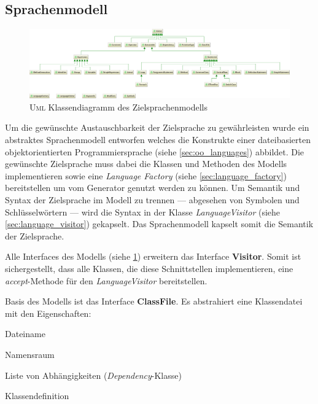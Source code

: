 \subsection{Sprachenmodell}
\label{sec:language_model}

\begin{figure}
    \centering
    \includegraphics[width=\textheight]{resources/languagemodel_common}
    \caption{\textsc{Uml} Klassendiagramm des Zielsprachenmodells}
    \label{fig:language_model}
\end{figure}

Um die gewünschte Austauschbarkeit der Zielsprache zu gewährleisten wurde ein abstraktes Sprachenmodell entworfen welches die Konstrukte einer dateibasierten objektorientierten Programmiersprache (siehe \cref{sec:oo_languages}) abbildet. 
Die gewünschte Zielsprache muss dabei die Klassen und Methoden des Modells implementieren sowie eine \emph{Language Factory} (siehe \cref{sec:language_factory}) bereitstellen um vom Generator genutzt werden zu können.
Um Semantik und Syntax der Zielsprache im Modell zu trennen --- abgesehen von Symbolen und Schlüsselwörtern --- wird die Syntax in der Klasse \emph{LanguageVisitor} (siehe \cref{sec:language_visitor}) gekapselt. Das Sprachenmodell kapselt somit die Semantik der Zielsprache.

Alle Interfaces des Modells (siehe \cref{fig:language_model}) erweitern das Interface \textbf{Visitor}. Somit ist sichergestellt, dass alle Klassen, die diese Schnittstellen implementieren, eine \emph{accept}-Methode für den \emph{LanguageVisitor} bereitstellen.

Basis des Modells ist das Interface \textbf{ClassFile}. Es abstrahiert eine Klassendatei mit den Eigenschaften:
\begin{compactitem}
    \item Dateiname
    \item Namensraum
    \item Liste von Abhängigkeiten (\emph{Dependency}-Klasse)
    \item Klassendefinition
\end{compactitem}

